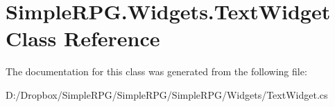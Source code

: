 \hypertarget{class_simple_r_p_g_1_1_widgets_1_1_text_widget}{\section{Simple\+R\+P\+G.\+Widgets.\+Text\+Widget Class Reference}
\label{class_simple_r_p_g_1_1_widgets_1_1_text_widget}
}


The documentation for this class was generated from the following file\+:\begin{DoxyCompactItemize}
\item 
D\+:/\+Dropbox/\+Simple\+R\+P\+G/\+Simple\+R\+P\+G/\+Simple\+R\+P\+G/\+Widgets/Text\+Widget.\+cs\end{DoxyCompactItemize}
